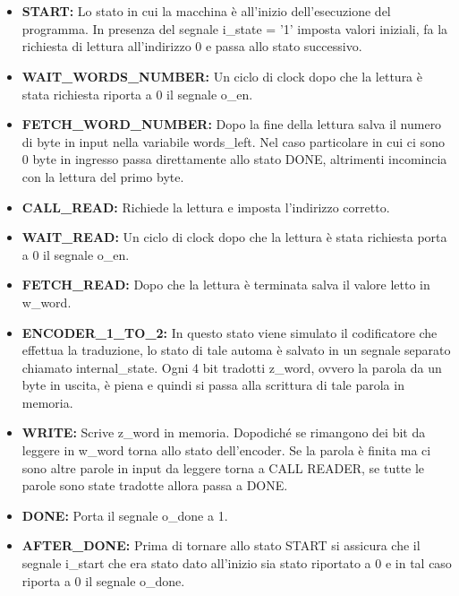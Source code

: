 \documentclass{article}
\begin{document}
\\
\\
\begin{itemize}
	\item \textbf{START:} Lo stato in cui la macchina è all'inizio dell'esecuzione del programma. In presenza del segnale i\_state = '1' imposta valori iniziali, fa la richiesta di lettura all'indirizzo 0 e passa allo stato successivo.
	\item \textbf{WAIT\_WORDS\_NUMBER:} Un ciclo di clock dopo che la lettura è stata richiesta riporta a 0 il segnale o\_en.
	\item \textbf{FETCH\_WORD\_NUMBER:} Dopo la fine della lettura salva il numero di byte in input nella variabile words\_left. Nel caso particolare in cui ci sono 0 byte in ingresso passa direttamente allo stato DONE, altrimenti incomincia con la lettura del primo byte.
	\item \textbf{CALL\_READ:} Richiede la lettura e imposta l'indirizzo corretto.
	\item \textbf{WAIT\_READ:} Un ciclo di clock dopo che la lettura è stata richiesta porta a 0 il segnale o\_en.
	\item \textbf{FETCH\_READ:} Dopo che la lettura è terminata salva il valore letto in w\_word.
	\item \textbf{ENCODER\_1\_TO\_2:} In questo stato viene simulato il codificatore che effettua la traduzione, lo stato di tale automa è salvato in un segnale separato chiamato internal\_state. Ogni 4 bit tradotti z\_word, ovvero la parola da un byte in uscita, è piena e quindi si passa alla scrittura di tale parola in memoria.
	\item \textbf{WRITE:} Scrive z\_word in memoria. Dopodiché se rimangono dei bit da leggere in w\_word torna allo stato dell'encoder. Se la parola è finita ma ci sono altre parole in input da leggere torna a CALL READER, se tutte le parole sono state tradotte allora passa a DONE.
	\item \textbf{DONE:} Porta il segnale o\_done a 1.
	\item \textbf{AFTER\_DONE:} Prima di tornare allo stato START si assicura che il segnale i\_start che era stato dato all'inizio sia stato riportato a 0 e in tal caso riporta a 0 il segnale o\_done.
\end{itemize}
\pagebreak
\end{document}
